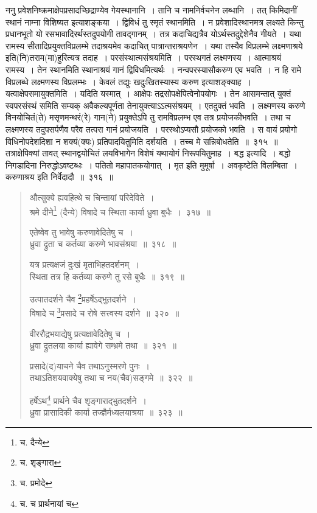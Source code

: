 \documentclass[11pt, openany]{book}
\begin{document}
ननु प्रवेशनिष्क्रमाक्षेपप्रसादच्छिद्राण्येव गेयस्थानानि~। तानि च नामनिर्वचनेन लब्धानि~। तत् किमिदानीं स्थानं नाम्ना विशिष्यत इत्याशङ्कया~। {\qtt द्विविधं तु स्मृतं} स्थानमिति~। न प्रवेशादिस्थानमत्र लक्ष्यते किन्तु प्रधानभूतो यो रसभावादिरर्थस्तदुपयोगी तावद्गानम्~। तत्र कदाचिद्यत्रैव योऽर्थस्तदुद्देशेनैव गीयते~। यथा {\qtt रामस्य सीतादिप्र}युक्तविप्रलम्भे तदाश्रयमेव कदाचित् पात्रान्तराश्रयणेन~। यथा तस्यैव विप्रलम्भे लक्ष्मणाश्रये इति(नि)तराम(मा)हुरित्यत्र तदाह~। {\qtt परसंस्थात्मसंश्रयमिति}~। परस्थगतं लक्ष्मणस्य~। आत्माश्रयं रामस्य~। तेन स्थानमिति स्थानाश्रयं गानं द्विविधमित्यर्थः~। नन्वपरस्यासौकरुण एव भवति~। न हि रामे विप्रलब्धे लक्ष्मणस्य विप्रलम्भः~। केवलं तद्युः खदुःखितस्यास्य करुण इत्याशङ्क्याह~। {\qtt यत्वाक्षेपसमायुक्तमिति}~। यदिति यस्मात्~। आक्षेपः तद्रसोपक्षेपित्वेनोपयोगः~। तेन आसमन्तात् युक्तं स्वपरसंस्थं समिति सम्यक् अवैकल्यपूर्णता तेनायुक्त्याऽऽत्मसंश्रयम्~। एतदुक्तं भवति~। लक्ष्मणस्य करुणे विनयोचितं(ते) मसृणमन्थरं(रे) गान(ने) प्रयुक्तेऽपि तु रामविप्रलम्भ एव तत्र प्रयोजकीभवति~। तथा च लक्ष्मणस्य तदुपसर्पणैव परैव तत्परा गानं प्रयोजयति~। परस्थोऽप्यसौ प्रयोजको भवति~। स वायं प्रयोगो विधिनोपदेशदिशा न शक्यं(क्यः) प्रतिपादयितुमिति दर्शयति~। {\qtt तच्च मे सन्निबोधतेति}~॥~३१५~॥\\

तत्राक्षेपिक्यां तावत् स्थानद्वयोचितं लयविभागेन विशेषं यथायोगं निरूपयितुमाह~। {\qtt बद्ध} इत्यादि~। {\qtt बद्धो} निगडादिना निरुद्धोऽवष्टब्धः~। पतितो महापातकयोगात्~। मृत इति मुमूर्षा~। अवकृष्टेति विलम्बिता~। करुणाश्रय इति निर्वेदादौ~॥~३१६~॥

\newpage

\begin{quote}
{\na औत्सुक्ये ह्यवहित्थे च चिन्तायां परिदेविते~।\\
 श्रमे दीने\renewcommand{\thefootnote}{1}\footnote{च. दैन्ये} (दैन्ये) विषादे च स्थिता कार्या ध्रुवा बुधैः~।~३१७~॥

 एतेष्वेव तु भावेषु करुणावेदितेषु च~। \\
 ध्रुवा द्रुता च कर्तव्या करुणे भावसंश्रया~॥~३१८~॥

 यत्र प्रत्यक्षजं दुःखं मृताभिहतदर्शनम्~।\\
 स्थिता तत्र हि कर्तव्या करुणे तु रसे बुधैः~॥~३१९~॥

 उत्पातदर्शने चैव \renewcommand{\thefootnote}{2}\footnote{च. शृङ्गारा}प्रहर्षेऽद्भुतदर्शने~। \\
 विषादे च \renewcommand{\thefootnote}{3}\footnote{च. प्रमोदे}प्रसादे च रोषे सत्त्वस्य दर्शने~॥~३२०~॥

 वीररौद्रभयाद्येषु प्रत्यक्षावेदितेषु च~।\\
 ध्रुवा द्रुतलया कार्या ह्यावेगे सम्भ्रमे तथा~॥~३२१~॥

 प्रसादे(द)याचने चैव तथाऽनुस्मरणे पुनः~। \\
 तथाऽतिशयवाक्येषु तथा च नय(चैव)सङ्गमे~॥~३२२~॥

 हर्षेऽथ\renewcommand{\thefootnote}{4}\footnote{च. च प्रार्थनायां च} प्रार्थने चैव शृङ्गाराद्भुतदर्शने~।\\
 ध्रुवा प्रासादिकी कार्या तज्ज्ञैर्मध्यलयाश्रया~॥~३२३~॥}
\end{quote}
\end{document}
